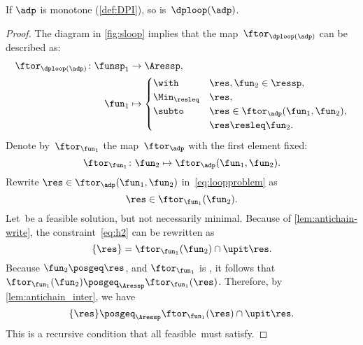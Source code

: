 \begin{proposition}
    \label{prop:loop-continuous}
    If $\adp$ is monotone (\cref{def:DPI}),
    so is~$\dploop(\adp)$.
\end{proposition}
\begin{proof}
    The diagram in \cref{fig:sloop} implies that the map~$\ftor_{\dploop(\adp)}$
    can be described as:
    \begin{align}
        \ftor_{\dploop(\adp)}\colon\funsp_{1} & \to\Aressp,\label{eq:loopproblem}                                                   \\
        \fun_{1}                              & \mapsto\begin{cases}
                                                           \with          & \res,\fun_{2}\in\ressp,                 \\
                                                           \Min_{\resleq} & \res,                                   \\
                                                           \subto         & \res\in\ftor_{\adp}(\fun_{1},\fun_{2}), \\
                                                                          & \res\resleq\fun_{2}.
                                                       \end{cases}
    \end{align}
    Denote by~$\ftor_{\fun_{1}}$ the map~$\ftor_{\adp}$ with the first element fixed:
    \begin{equation*}
        \ftor_{\fun_{1}}\colon\fun_{2}\mapsto\ftor_{\adp}(\fun_{1},\fun_{2}).
    \end{equation*}
    Rewrite $\res\in\ftor_{\adp}(\fun_{1},\fun_{2})$ in~\cref{eq:loopproblem} as
    \begin{equation}
        \res\in\ftor_{\fun_{1}}(\fun_{2}).
        \label{eq:h2}
    \end{equation}
    Let~\res be a feasible solution, but not necessarily minimal.
    Because of \cref{lem:antichain-write}, the constraint~\cref{eq:h2} can be rewritten as
    \begin{equation}
        \{\res\}=\ftor_{\fun_{1}}(\fun_{2})\cap\upit\res.
        \label{eq:h3}
    \end{equation}
    Because $\fun_{2}\posgeq\res$, and $\ftor_{\fun_{1}}$ is \scottcontinuous, it follows that~$\ftor_{\fun_{1}}(\fun_{2})\posgeq_{\Aressp}\ftor_{\fun_{1}}(\res)$.
    Therefore, by \cref{lem:antichain_inter}, we have
    \begin{equation}
        \{\res\}\posgeq_{\Aressp}\ftor_{\fun_{1}}(\res)\cap\upit\res.
        \label{eq:fea}
    \end{equation}
    This is a recursive condition that all feasible~\res must satisfy.


\end{proof}
